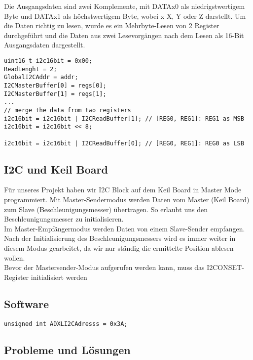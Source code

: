 Die Ausgangsdaten sind zwei Komplemente, mit DATAx0 als niedrigstwertigem Byte und DATAx1 als höchstwertigem Byte, wobei x X, Y oder Z darstellt. Um die Daten richtig zu lesen, wurde es ein Mehrbyte-Lesen von 2 Register durchgeführt und die Daten aus zwei Lesevorgängen nach dem Lesen als 16-Bit Ausgangsdaten dargestellt. 

\begin{lstlisting}
uint16_t i2c16bit = 0x00;
ReadLenght = 2;
GlobalI2CAddr = addr;
I2CMasterBuffer[0] = regs[0];
I2CMasterBuffer[1] = regs[1];
...
// merge the data from two registers
i2c16bit = i2c16bit | I2CReadBuffer[1]; // [REG0, REG1]: REG1 as MSB
i2c16bit = i2c16bit << 8;

i2c16bit = i2c16bit | I2CReadBuffer[0]; // [REG0, REG1]: REG0 as LSB

\end{lstlisting}

\subsection{I2C und Keil Board}
Für unseres Projekt haben wir I2C Block auf dem Keil Board in Master Mode programmiert. Mit Master-Sendermodus werden Daten vom Master (Keil Board) zum Slave (Beschleunigungsmesser) übertragen. So erlaubt uns den Beschleunigungsmesser zu initialisieren. \\

Im Master-Empfängermodus werden Daten von einem Slave-Sender empfangen. Nach der Initialisierung des Beschleunigungsmessers wird es immer weiter in diesem Modus gearbeitet, da wir nur ständig die ermittelte Position ablesen wollen. \\

Bevor der Mastersender-Modus aufgerufen werden kann, muss das I2CONSET-Register initialisiert werden

\subsection{Software}

\begin{lstlisting}
unsigned int ADXLI2CAdresss = 0x3A;

\end{lstlisting}


\subsection{Probleme und Lösungen}
